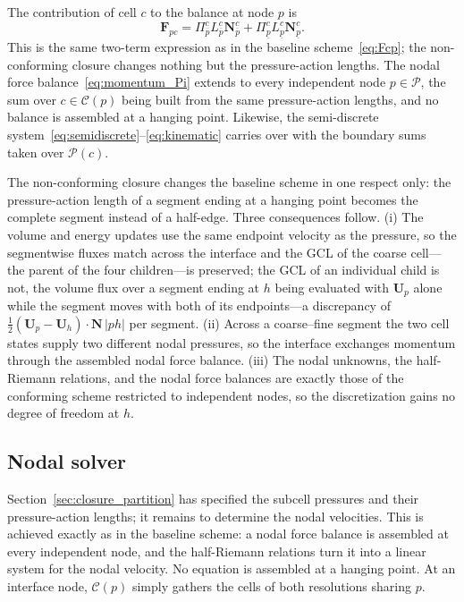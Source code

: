\documentclass[a4paper]{cas-sc}
\begin{document}
The contribution of cell $c$ to the balance at node $p$ is
\begin{equation}
 \boldsymbol F_{pc}
 =\Pi_{\overline p}^{c}L_{\overline p}^{c}\boldsymbol N_{\overline p}^{c}
  +\Pi_{\underline p}^{c}L_{\underline p}^{c}\boldsymbol N_{\underline p}^{c}.
 \label{eq:closure_force}
\end{equation}
This is the same two-term expression as in the baseline scheme~\eqref{eq:Fcp}; the non-conforming closure changes nothing but the pressure-action lengths. The nodal force balance~\eqref{eq:momentum_Pi} extends to every independent node $p\in\mathcal P$, the sum over $c\in\mathcal C(p)$ being built from the same pressure-action lengths, and no balance is assembled at a hanging point. Likewise, the semi-discrete system~\eqref{eq:semidiscrete}--\eqref{eq:kinematic} carries over with the boundary sums taken over $\mathcal P(c)$.

The non-conforming closure changes the baseline scheme in one respect only: the pressure-action length of a segment ending at a hanging point becomes the complete segment instead of a half-edge. Three consequences follow. (i) The volume and energy updates use the same endpoint velocity as the pressure, so the segmentwise fluxes match across the interface and the GCL of the coarse cell---the parent of the four children---is preserved; the GCL of an individual child is not, the volume flux over a segment ending at $h$ being evaluated with $\boldsymbol U_p$ alone while the segment moves with both of its endpoints---a discrepancy of $\tfrac12(\boldsymbol U_p-\boldsymbol U_h)\cdot\boldsymbol N\,|ph|$ per segment. (ii) Across a coarse--fine segment the two cell states supply two different nodal pressures, so the interface exchanges momentum through the assembled nodal force balance. (iii) The nodal unknowns, the half-Riemann relations, and the nodal force balances are exactly those of the conforming scheme restricted to independent nodes, so the discretization gains no degree of freedom at $h$.


\subsection{Nodal solver}
\label{sec:closure_solver}

Section~\ref{sec:closure_partition} has specified the subcell pressures and their pressure-action lengths; it remains to determine the nodal velocities. This is achieved exactly as in the baseline scheme: a nodal force balance is assembled at every independent node, and the half-Riemann relations turn it into a linear system for the nodal velocity. No equation is assembled at a hanging point. At an interface node, $\mathcal C(p)$ simply gathers the cells of both resolutions sharing $p$.
\end{document}

